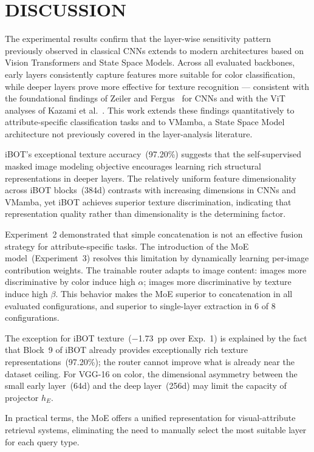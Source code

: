 \documentclass[letterpaper, 10 pt, conference]{ieeeconf}
\begin{document}
\section{DISCUSSION}

The experimental results confirm that the layer-wise sensitivity pattern
previously observed in classical CNNs extends to modern architectures
based on Vision Transformers and State Space Models.
Across all evaluated backbones, early layers consistently capture features
more suitable for color classification, while deeper layers prove more
effective for texture recognition — consistent with the foundational
findings of Zeiler and Fergus~\cite{bzeiler} for CNNs and with the ViT
analyses of Kazami et al.~\cite{bkazami}.
This work extends these findings quantitatively to attribute-specific
classification tasks and to VMamba, a State Space Model architecture not
previously covered in the layer-analysis literature.

iBOT's exceptional texture accuracy~(97.20\%) suggests that the
self-supervised masked image modeling objective encourages learning rich
structural representations in deeper layers.
The relatively uniform feature dimensionality across iBOT blocks~(384d)
contrasts with increasing dimensions in CNNs and VMamba, yet iBOT achieves
superior texture discrimination, indicating that representation quality
rather than dimensionality is the determining factor.

Experiment~2 demonstrated that simple concatenation is not an effective
fusion strategy for attribute-specific tasks.
The introduction of the MoE model~(Experiment~3) resolves this limitation
by dynamically learning per-image contribution weights.
The trainable router adapts to image content: images more discriminative by
color induce high $\alpha$; images more discriminative by texture induce
high $\beta$.
This behavior makes the MoE superior to concatenation in all evaluated
configurations, and superior to single-layer extraction in 6 of 8
configurations.

The exception for iBOT texture~($-$1.73~pp over Exp.~1) is explained by
the fact that Block~9 of iBOT already provides exceptionally rich texture
representations~(97.20\%); the router cannot improve what is already near
the dataset ceiling.
For VGG-16 on color, the dimensional asymmetry between the small early
layer~(64d) and the deep layer~(256d) may limit the capacity of projector
$h_E$.

In practical terms, the MoE offers a unified representation for
visual-attribute retrieval systems, eliminating the need to manually select
the most suitable layer for each query type.
\end{document}
